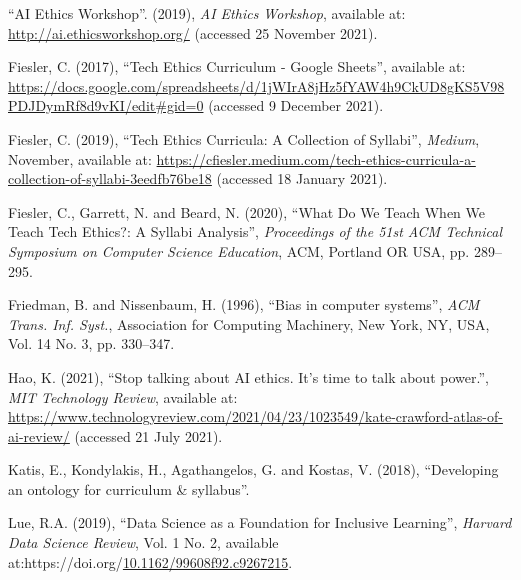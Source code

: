 \documentclass[
]{article}
\newlength{\cslhangindent}
\newlength{\cslentryspacingunit} %
\newenvironment{CSLReferences}[2] %
 {%
  \setlength{\parindent}{0pt}
  \ifodd #1
  \let\oldpar\par
  \def\par{\hangindent=\cslhangindent\oldpar}
  \fi
  \setlength{\parskip}{#2\cslentryspacingunit}
 }%
 {}
\begin{document}
\hypertarget{refs}{}
\begin{CSLReferences}{1}{0}
\leavevmode{}%
{``{AI} {Ethics} {Workshop}''}. (2019), \emph{AI Ethics Workshop},
available at: \url{http://ai.ethicsworkshop.org/} (accessed 25 November
2021).

\leavevmode{}%
Fiesler, C. (2017), {``Tech {Ethics} {Curriculum} - {Google}
{Sheets}''}, available at:
\url{https://docs.google.com/spreadsheets/d/1jWIrA8jHz5fYAW4h9CkUD8gKS5V98PDJDymRf8d9vKI/edit\#gid=0}
(accessed 9 December 2021).

\leavevmode{}%
Fiesler, C. (2019), {``Tech {Ethics} {Curricula}: {A} {Collection} of
{Syllabi}''}, \emph{Medium}, November, available at:
\url{https://cfiesler.medium.com/tech-ethics-curricula-a-collection-of-syllabi-3eedfb76be18}
(accessed 18 January 2021).

\leavevmode{}%
Fiesler, C., Garrett, N. and Beard, N. (2020), {``What {Do} {We} {Teach}
{When} {We} {Teach} {Tech} {Ethics}?: {A} {Syllabi} {Analysis}''},
\emph{Proceedings of the 51st {ACM} {Technical} {Symposium} on
{Computer} {Science} {Education}}, ACM, Portland OR USA, pp. 289--295.

\leavevmode{}%
Friedman, B. and Nissenbaum, H. (1996), {``Bias in computer systems''},
\emph{ACM Trans. Inf. Syst.}, Association for Computing Machinery, New
York, NY, USA, Vol. 14 No. 3, pp. 330--347.

\leavevmode{}%
Hao, K. (2021), {``Stop talking about {AI} ethics. {It}'s time to talk
about power.''}, \emph{MIT Technology Review}, available at:
\url{https://www.technologyreview.com/2021/04/23/1023549/kate-crawford-atlas-of-ai-review/}
(accessed 21 July 2021).

\leavevmode{}%
Katis, E., Kondylakis, H., Agathangelos, G. and Kostas, V. (2018),
{``Developing an ontology for curriculum \& syllabus''}.

\leavevmode{}%
Lue, R.A. (2019), {``Data {Science} as a {Foundation} for {Inclusive}
{Learning}''}, \emph{Harvard Data Science Review}, Vol. 1 No. 2,
available
at:https://doi.org/\href{https://doi.org/10.1162/99608f92.c9267215}{10.1162/99608f92.c9267215}.


\end{CSLReferences}
\end{document}
